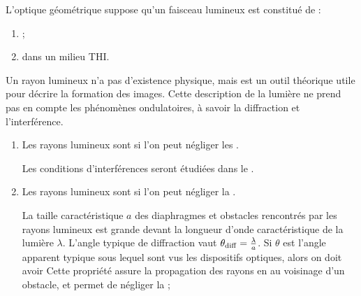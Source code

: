 \documentclass[12pt,fancy]{cours}
\begin{document}
\begin{prop}\label{prop:}
  L'optique géométrique suppose qu'un faisceau lumineux est constitué de  :
  \begin{enumerate}
    \item {} ;
    \item {} dans un milieu THI.
  \end{enumerate}
\end{prop}
 Un rayon lumineux n'a pas d'existence physique, mais est un outil théorique utile pour décrire la formation des images.
Cette description de la lumière ne prend pas en compte les phénomènes ondulatoires, à savoir la diffraction et l'interférence. 
\begin{enumerate}

\item Les rayons lumineux sont  si l'on peut négliger les .

Les conditions d'interférences seront étudiées dans le .




  \item Les rayons lumineux sont  si l'on peut négliger la . 


La taille caractéristique $a$ des diaphragmes et obstacles rencontrés par les rayons lumineux est grande devant la longueur d'onde caractéristique de la lumière $\lambda$. L'angle typique de diffraction vaut $\theta_{\rm diff} = \frac{\lambda}{a}$. Si $\theta$ est l'angle apparent typique sous lequel sont vus les dispositifs optiques, alors on doit avoir
Cette propriété assure la propagation des rayons en  au voisinage d'un obstacle, et permet de négliger la  ;


\end{enumerate}
\end{document}
